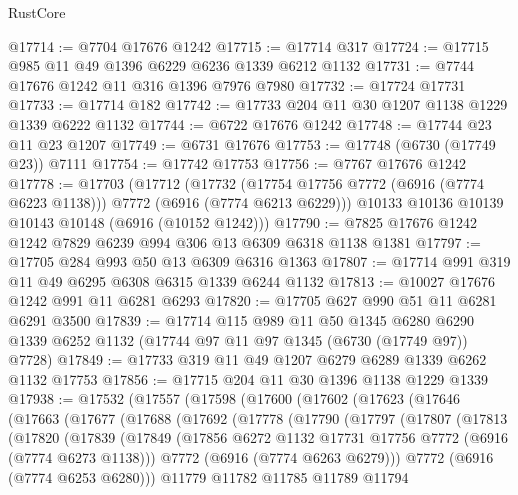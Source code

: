\begin{lexlean}{RustCore}
\begin{coremodule}
@17714 := @7704 @17676 @1242
@17715 := @17714 @317
@17724 := @17715 @985 @11 @49 @1396 @6229 @6236 @1339 @6212 @1132
@17731 := @7744 @17676 @1242 @11 @316 @1396 @7976 @7980
@17732 := @17724 @17731
@17733 := @17714 @182
@17742 := @17733 @204 @11 @30 @1207 @1138 @1229 @1339 @6222 @1132
@17744 := @6722 @17676 @1242
@17748 := @17744 @23 @11 @23 @1207
@17749 := @6731 @17676
@17753 := @17748 (@6730 (@17749 @23)) @7111
@17754 := @17742 @17753
@17756 := @7767 @17676 @1242
@17778 := @17703
    (@17712
      (@17732 (@17754 @17756 @7772 (@6916 (@7774 @6223 @1138))) @7772 (@6916 (@7774 @6213 @6229)))
      @10133
      @10136
      @10139
      @10143
      @10148
      (@6916 (@10152 @1242)))
@17790 := @7825 @17676 @1242 @1242 @7829 @6239 @994 @306 @13 @6309 @6318 @1138 @1381
@17797 := @17705 @284 @993 @50 @13 @6309 @6316 @1363
@17807 := @17714 @991 @319 @11 @49 @6295 @6308 @6315 @1339 @6244 @1132
@17813 := @10027 @17676 @1242 @991 @11 @6281 @6293
@17820 := @17705 @627 @990 @51 @11 @6281 @6291 @3500
@17839 := @17714
    @115
    @989
    @11
    @50
    @1345
    @6280
    @6290
    @1339
    @6252
    @1132
    (@17744 @97 @11 @97 @1345 (@6730 (@17749 @97)) @7728)
@17849 := @17733 @319 @11 @49 @1207 @6279 @6289 @1339 @6262 @1132 @17753
@17856 := @17715 @204 @11 @30 @1396 @1138 @1229 @1339
@17938 := @17532
    (@17557
      (@17598
        (@17600
          (@17602
            (@17623
              (@17646
                (@17663
                  (@17677
                    (@17688
                      (@17692
                        (@17778
                          (@17790
                            (@17797
                              (@17807
                                (@17813
                                  (@17820
                                    (@17839
                                      (@17849
                                        (@17856
                                          @6272
                                          @1132
                                          @17731
                                          @17756
                                          @7772
                                          (@6916 (@7774 @6273 @1138)))
                                        @7772
                                        (@6916 (@7774 @6263 @6279)))
                                      @7772
                                      (@6916 (@7774 @6253 @6280)))
                                    @11779
                                    @11782
                                    @11785
                                    @11789
                                    @11794

\end{coremodule}
\end{lexlean}
